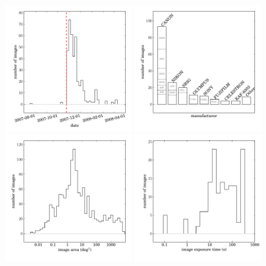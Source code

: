 \documentclass[12pt,preprint]{aastex}
\begin{document}
\clearpage
\begin{figure}
\begin{center}
\includegraphics[width=0.49\textwidth]{exif1}
\includegraphics[width=0.49\textwidth]{exif2}
\includegraphics[width=0.49\textwidth]{exif4}
\includegraphics[width=0.49\textwidth]{exif6}

\end{center}
\end{figure}
\end{document}
